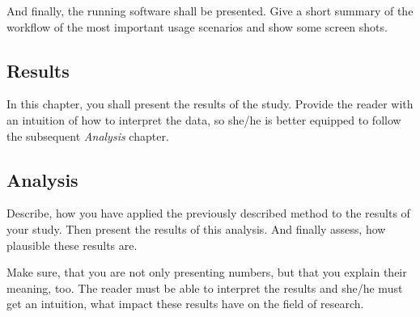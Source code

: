 And finally, the running software shall be presented.
Give a short summary of the workflow of the most important usage scenarios and show some screen shots.

\subsection{Results}
In this chapter, you shall present the results of the study.
Provide the reader with an intuition of how to interpret the data, so she/he is better equipped to follow the subsequent \textit{Analysis} chapter.

\subsection{Analysis}
Describe, how you have applied the previously described method to the results of your study.
Then present the results of this analysis.
And finally assess, how plausible these results are.

Make sure, that you are not only presenting numbers, but that you explain their meaning, too.
The reader must be able to interpret the results and she/he must get an intuition, what impact these results have on the field of research.

